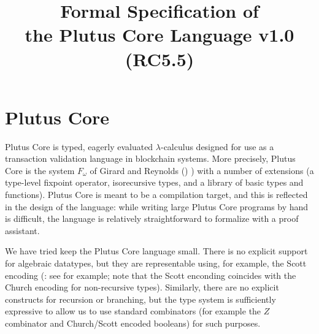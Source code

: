 \documentclass[a4paper]{article}
\begin{document}
%
\title{Formal Specification of\\the Plutus Core Language v1.0 (RC5.5)}


\maketitle

\thispagestyle{plain}
\pagestyle{plain}



\section{Plutus Core}

Plutus Core is typed, eagerly evaluated $\lambda$-calculus designed
for use as a transaction validation language in blockchain
systems. More precisely, Plutus Core is the system $F_\omega$ of
Girard and Reynolds (\cite{Girard-thesis})
\cite{Reynolds-type-structure} \cite[\S30]{Pierce:TAPL}) with a number
of extensions (a type-level fixpoint operator, isorecursive types, and 
a library of basic types and functions).  Plutus Core is
meant to be a compilation target, and this is reflected in the design
of the language: while writing large Plutus Core programs by hand is
difficult, the language is relatively straightforward to formalize
with a proof assistant.

We have tried keep the Plutus Core language small. There is no
explicit support for algebraic datatypes, but they are representable
using, for example, the Scott encoding (\cite{Scott-encoding}: see
\cite{Koopman:2014} for example; note that the Scott enconding
coincides with the Church encoding for non-recursive
types). Similarly, there are no explicit constructs for recursion or
branching, but the type system is sufficiently expressive to allow us
to use standard combinators (for example the $Z$ combinator and
Church/Scott encoded booleans) for such purposes.
\end{document}
